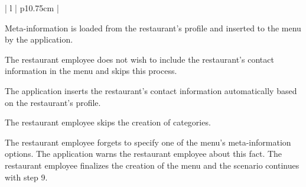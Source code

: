 \begin{center}
\begin{tabular}{| l | p{10.75cm} | }
\begin{minipage}[t]{\linewidth}
\begin{description}[nosep,after=\strut]
        \item [A1:] Meta-information is loaded from the restaurant's profile and inserted to the menu by the application.
        \item [A2:] The restaurant employee does not wish to include the restaurant's contact information in the menu and skips this process. 
        \item [A3:] The application inserts the restaurant's contact information automatically based on the restaurant's profile.
        \item [A4:] The restaurant employee skips the creation of categories.
        \item [A5:] The restaurant employee forgets to specify one of the menu's meta-information options. The application warns the restaurant employee about this fact. The restaurant employee finalizes the creation of the menu and the scenario continues with step 9.
      \end{description}
    \end{minipage}
    \\
    \hline
  \end{tabular}
  \newline
\end{center}

\newpage

